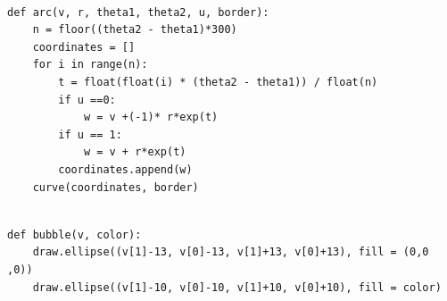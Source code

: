 \documentclass{book}
\newcounter{pcounter}
\begin{document}
\begin{center}
\begin{tcolorbox}[width=5in,colback={white},title={\begin{center}\texttt{Python \thepcounter} \addtocounter{pcounter}{1}  \end{center}},colbacktitle=Red,coltitle=black]
\begin{verbatim}

def arc(v, r, theta1, theta2, u, border):
    n = floor((theta2 - theta1)*300)
    coordinates = []
    for i in range(n):
        t = float(float(i) * (theta2 - theta1)) / float(n)
        if u ==0:
            w = v +(-1)* r*exp(t)
        if u == 1:
            w = v + r*exp(t)          
        coordinates.append(w)
    curve(coordinates, border)

\end{verbatim}%
\end{tcolorbox}
\end{center}

\begin{center}
\begin{tcolorbox}[width=5in,colback={white},title={\begin{center}\texttt{Python \thepcounter} \addtocounter{pcounter}{1}  \end{center}},colbacktitle=Red,coltitle=black]
\begin{verbatim}

def bubble(v, color):
    draw.ellipse((v[1]-13, v[0]-13, v[1]+13, v[0]+13), fill = (0,0 ,0))
    draw.ellipse((v[1]-10, v[0]-10, v[1]+10, v[0]+10), fill = color)

\end{verbatim}%
\end{tcolorbox}
\end{center}
\end{document}
